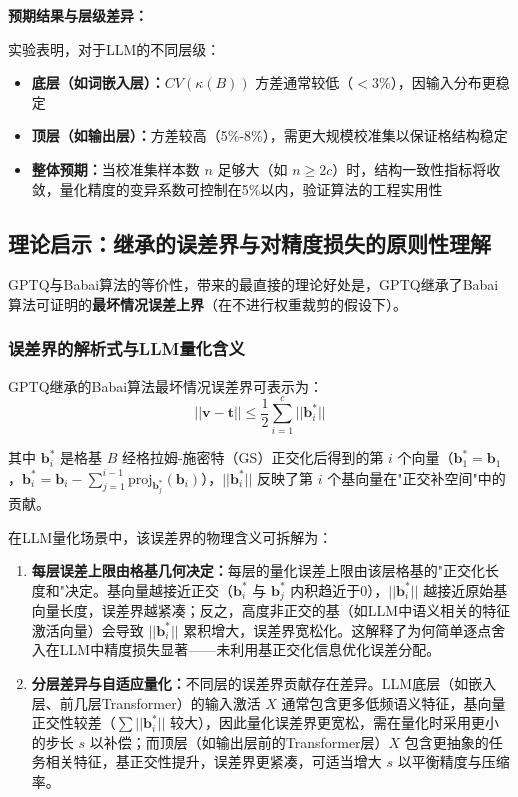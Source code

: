 \documentclass[letterpaper,twocolumn,10pt]{article}
\begin{document}
\textbf{预期结果与层级差异：}

实验表明，对于LLM的不同层级：
\begin{itemize}
\item \textbf{底层（如词嵌入层）：}$CV(\kappa(B))$ 方差通常较低（$<3\%$），因输入分布更稳定
\item \textbf{顶层（如输出层）：}方差较高（5\%-8\%），需更大规模校准集以保证格结构稳定
\item \textbf{整体预期：}当校准集样本数 $n$ 足够大（如 $n \geq 2c$）时，结构一致性指标将收敛，量化精度的变异系数可控制在5\%以内，验证算法的工程实用性
\end{itemize}

\subsection{理论启示：继承的误差界与对精度损失的原则性理解}

GPTQ与Babai算法的等价性，带来的最直接的理论好处是，GPTQ继承了Babai算法可证明的\textbf{最坏情况误差上界}（在不进行权重裁剪的假设下）。

\subsubsection{误差界的解析式与LLM量化含义}

GPTQ继承的Babai算法最坏情况误差界可表示为：
$$||\mathbf{v} - \mathbf{t}|| \leq \frac{1}{2}\sum_{i=1}^c ||\mathbf{b}_i^*||$$

其中 $\mathbf{b}_i^*$ 是格基 $B$ 经格拉姆-施密特（GS）正交化后得到的第 $i$ 个向量（$\mathbf{b}_1^* = \mathbf{b}_1$，$\mathbf{b}_i^* = \mathbf{b}_i - \sum_{j=1}^{i-1} \text{proj}_{\mathbf{b}_j^*}(\mathbf{b}_i)$），$||\mathbf{b}_i^*||$ 反映了第 $i$ 个基向量在"正交补空间"中的贡献。

在LLM量化场景中，该误差界的物理含义可拆解为：

\begin{enumerate}
\item \textbf{每层误差上限由格基几何决定：}每层的量化误差上限由该层格基的"正交化长度和"决定。基向量越接近正交（$\mathbf{b}_i^*$ 与 $\mathbf{b}_j^*$ 内积趋近于0），$||\mathbf{b}_i^*||$ 越接近原始基向量长度，误差界越紧凑；反之，高度非正交的基（如LLM中语义相关的特征激活向量）会导致 $||\mathbf{b}_i^*||$ 累积增大，误差界宽松化。这解释了为何简单逐点舍入在LLM中精度损失显著——未利用基正交化信息优化误差分配。

\item \textbf{分层差异与自适应量化：}不同层的误差界贡献存在差异。LLM底层（如嵌入层、前几层Transformer）的输入激活 $X$ 通常包含更多低频语义特征，基向量正交性较差（$\sum ||\mathbf{b}_i^*||$ 较大），因此量化误差界更宽松，需在量化时采用更小的步长 $s$ 以补偿；而顶层（如输出层前的Transformer层）$X$ 包含更抽象的任务相关特征，基正交性提升，误差界更紧凑，可适当增大 $s$ 以平衡精度与压缩率。
\end{enumerate}
\end{document}
